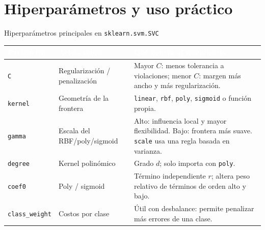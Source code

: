 \section{Hiperparámetros y uso práctico}

\begin{frame}{Hiperparámetros principales en \texttt{sklearn.svm.SVC}}
\scriptsize
\renewcommand{\arraystretch}{1.40}
\setlength{\tabcolsep}{4.6pt}
\begin{center}
\begin{tabular}{p{2.05cm}p{4.0cm}p{6.15cm}}
\toprule
\rowcolor{ccdenavy}
\textcolor{white}{\textbf{Parámetro}} &
\textcolor{white}{\textbf{Actúa sobre}} &
\textcolor{white}{\textbf{Qué ocurre al modificarlo}}\\
\midrule
\texttt{C} & Regularización / penalización & Mayor $C$: menos tolerancia a violaciones; menor $C$: margen más ancho y más regularización.\\
\rowcolor{ccdeice!50}
\texttt{kernel} & Geometría de la frontera & \texttt{linear}, \texttt{rbf}, \texttt{poly}, \texttt{sigmoid} o función propia.\\
\texttt{gamma} & Escala del RBF/poly/sigmoid & Alto: influencia local y mayor flexibilidad. Bajo: frontera más suave. \texttt{scale} usa una regla basada en varianza.\\
\rowcolor{ccdeice!50}
\texttt{degree} & Kernel polinómico & Grado $d$; solo importa con \texttt{poly}.\\
\texttt{coef0} & Poly / sigmoid & Término independiente $r$; altera peso relativo de términos de orden alto y bajo.\\
\rowcolor{ccdeice!50}
\texttt{class\_weight} & Costos por clase & Útil con desbalance: permite penalizar más errores de una clase.\\
\bottomrule
\end{tabular}
\end{center}
\end{frame}

